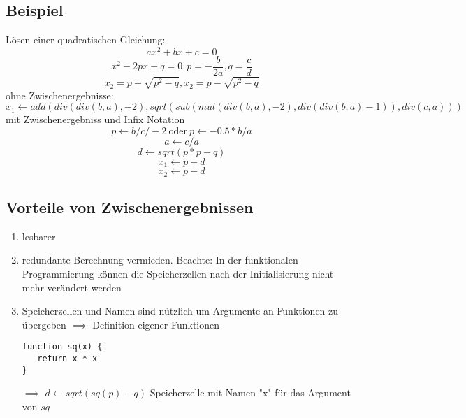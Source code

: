 \documentclass[a4paper]{scrartcl}
\theoremstyle{definition}
\theoremstyle{plain}
\theoremstyle{remark}
\theoremstyle{remark}
\begin{document}
\subsection{Beispiel}
\label{sec-6-1}
Lösen einer quadratischen Gleichung:
\[ax^2 + bx + c = 0\]
\[x^2 - 2px + q = 0, p = -\frac{b}{2a},q=\frac{c}{d}\]
\[x_2 = p + \sqrt{p^2 - q},x_2 = p - \sqrt{p^2 - q}\]
ohne Zwischenergebnisse:
\[x_1 \leftarrow add(div(div(b,a),-2),sqrt(sub(mul(div(b,a),-2),div(div(b,a)-1)),div(c,a)))\]
mit Zwischenergebniss und Infix Notation
\[p\leftarrow b / c / -2~\text{oder}~p\leftarrow -0.5 * b / a\]
\[a\leftarrow c / a\]
\[d\leftarrow sqrt(p*p - q)\]
\[x_1\leftarrow p + d\]
\[x_2\leftarrow p - d\]
\subsection{Vorteile von Zwischenergebnissen}
\label{sec-6-2}
\begin{enumerate}
\item lesbarer
\item redundante Berechnung vermieden. Beachte: In der funktionalen Programmierung können die Speicherzellen nach der Initialisierung nicht mehr verändert werden
\item Speicherzellen und Namen sind nützlich um Argumente an Funktionen zu übergeben $\implies$ Definition eigener Funktionen
\begin{verbatim}
function sq(x) {
   return x * x
}
\end{verbatim}
$\implies$ $d \leftarrow sqrt(sq(p) - q)$
Speicherzelle mit Namen "x" für das Argument von $sq$
\end{enumerate}
\end{document}
